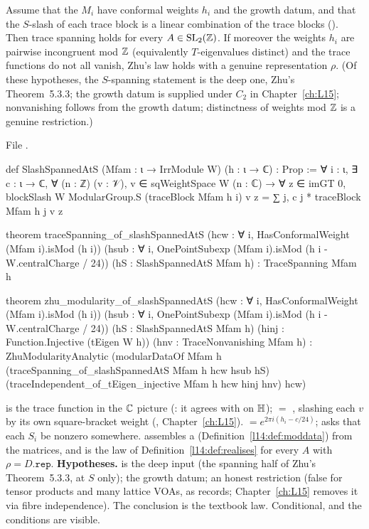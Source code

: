 \begin{theorem}\label{l14:thm:rhoS}
Assume that the $M_i$ have conformal weights $h_i$ and the growth datum, and that the $S$-slash of each trace block is a linear
combination of the trace blocks (). Then trace spanning holds for every $A\in\mathrm{SL}_2(\mathbb{Z})$. If moreover
the weights $h_i$ are pairwise incongruent mod ${\mathbb{Z}}$ (equivalently $T$-eigenvalues distinct) and the trace functions do not all
vanish, Zhu's law holds with a genuine representation $\rho$. (Of these hypotheses, the $S$-spanning statement is the deep
one, Zhu's Theorem~5.3.3; the growth datum is supplied under $C_2$ in Chapter~\ref{ch:L15}; nonvanishing follows from the
growth datum; distinctness of weights mod ${\mathbb{Z}}$ is a genuine restriction.)
\end{theorem}
\noindent File .
\begin{leancode}
def SlashSpannedAtS (Mfam : ι → IrrModule W) (h : ι → ℂ) : Prop :=
  ∀ i : ι, ∃ c : ι → ℂ, ∀ (n : ℤ) (v : 𝒱), v ∈ sqWeightSpace W (n : ℂ) → ∀ z ∈ imGT 0,
    blockSlash W ModularGroup.S (traceBlock Mfam h i) v z
      = ∑ j, c j * traceBlock Mfam h j v z

theorem traceSpanning_of_slashSpannedAtS (hcw : ∀ i, HasConformalWeight (Mfam i).isMod (h i))
    (hsub : ∀ i, OnePointSubexp (Mfam i).isMod (h i - W.centralCharge / 24))
    (hS : SlashSpannedAtS Mfam h) : TraceSpanning Mfam h

theorem zhu_modularity_of_slashSpannedAtS (hcw : ∀ i, HasConformalWeight (Mfam i).isMod (h i))
    (hsub : ∀ i, OnePointSubexp (Mfam i).isMod (h i - W.centralCharge / 24))
    (hS : SlashSpannedAtS Mfam h)
    (hinj : Function.Injective (tEigen W h)) (hnv : TraceNonvanishing Mfam h) :
    ZhuModularityAnalytic
      (modularDataOf Mfam h (traceSpanning_of_slashSpannedAtS Mfam h hcw hsub hS)
        (traceIndependent_of_tEigen_injective Mfam h hcw hinj hnv) hcw)
\end{leancode}
\begin{dictionary}
 is the trace function in the ${\mathbb{C}}$ picture (: it agrees with  on
$\mathbb{H}$);  $=$ , slashing each $v$ by its own square-bracket
weight (, Chapter~\ref{ch:L15}).  $=e^{2\pi i(h_i-c/24)}$; 
asks that each $S_i$ be nonzero somewhere.  assembles a  (Definition~\ref{l14:def:moddata})
from the matrices, and  is the law of Definition~\ref{l14:def:realises} for every $A$ with
$\rho = D.\mathtt{rep}$. \textbf{Hypotheses.}  is the deep input (the spanning half of Zhu's Theorem~5.3.3, at $S$
only);  the growth datum;  an honest restriction (false for tensor products and many lattice VOAs, as
 records; Chapter~\ref{ch:L15} removes it via fibre independence). The conclusion is the
textbook law. Conditional, and the conditions are visible.
\end{dictionary}
